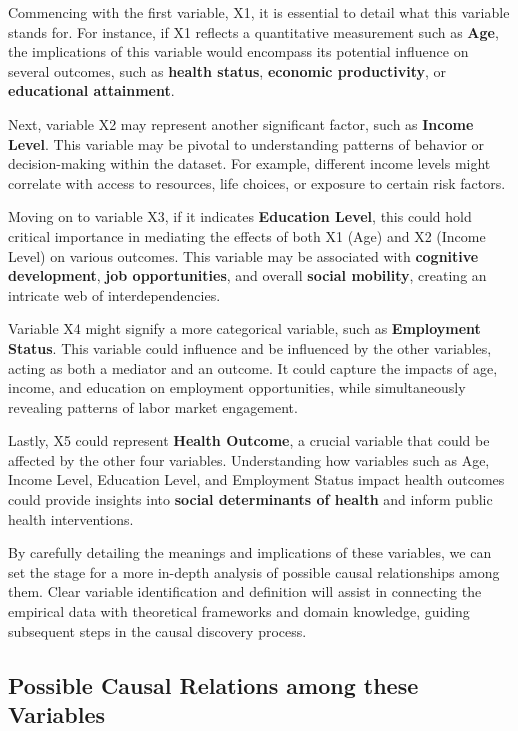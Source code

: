 \documentclass{article}
\begin{document}
Commencing with the first variable, X1, it is essential to detail what this variable stands for. For instance, if X1 reflects a quantitative measurement such as \textbf{Age}, the implications of this variable would encompass its potential influence on several outcomes, such as \textbf{health status}, \textbf{economic productivity}, or \textbf{educational attainment}.

Next, variable X2 may represent another significant factor, such as \textbf{Income Level}. This variable may be pivotal to understanding patterns of behavior or decision-making within the dataset. For example, different income levels might correlate with access to resources, life choices, or exposure to certain risk factors.

Moving on to variable X3, if it indicates \textbf{Education Level}, this could hold critical importance in mediating the effects of both X1 (Age) and X2 (Income Level) on various outcomes. This variable may be associated with \textbf{cognitive development}, \textbf{job opportunities}, and overall \textbf{social mobility}, creating an intricate web of interdependencies.

Variable X4 might signify a more categorical variable, such as \textbf{Employment Status}. This variable could influence and be influenced by the other variables, acting as both a mediator and an outcome. It could capture the impacts of age, income, and education on employment opportunities, while simultaneously revealing patterns of labor market engagement.

Lastly, X5 could represent \textbf{Health Outcome}, a crucial variable that could be affected by the other four variables. Understanding how variables such as Age, Income Level, Education Level, and Employment Status impact health outcomes could provide insights into \textbf{social determinants of health} and inform public health interventions.

By carefully detailing the meanings and implications of these variables, we can set the stage for a more in-depth analysis of possible causal relationships among them. Clear variable identification and definition will assist in connecting the empirical data with theoretical frameworks and domain knowledge, guiding subsequent steps in the causal discovery process.

\subsection{Possible Causal Relations among these Variables}
\end{document}
